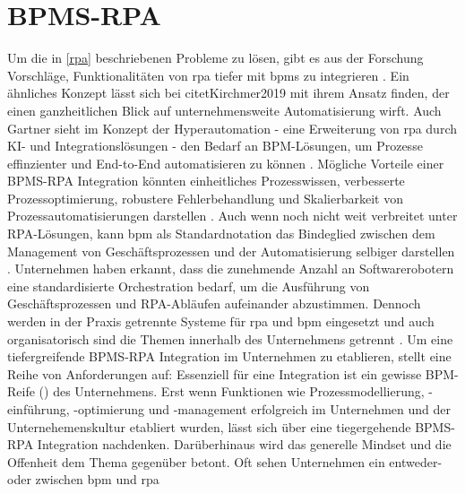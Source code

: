     \section{BPMS-RPA}
    Um die in \ref{rpa} beschriebenen Probleme zu lösen, gibt es aus der Forschung Vorschläge, Funktionalitäten von \gls{rpa} tiefer mit \gls{bpms} zu integrieren \citep{Flechsig2019}. Ein ähnliches Konzept lässt sich bei citet{Kirchmer2019} mit ihrem  Ansatz finden, der einen ganzheitlichen Blick auf unternehmensweite Automatisierung wirft. Auch Gartner sieht im Konzept der Hyperautomation - eine Erweiterung von \gls{rpa} durch KI- und Integrationslösungen - den Bedarf an BPM-Lösungen, um Prozesse effinzienter und End-to-End automatisieren zu können \citep{Gartner2024}. Mögliche Vorteile einer BPMS-RPA Integration könnten einheitliches Prozesswissen, verbesserte Prozessoptimierung, robustere Fehlerbehandlung und Skalierbarkeit von Prozessautomatisierungen darstellen \citep[S. 2]{Flechsig2022Umfrage}. Auch wenn noch nicht weit verbreitet unter RPA-Lösungen, kann \gls{bpm} als Standardnotation das Bindeglied zwischen dem Management von Geschäftsprozessen und der Automatisierung selbiger darstellen \citep{Völker2021}. Unternehmen haben erkannt, dass die zunehmende Anzahl an Softwarerobotern eine standardisierte Orchestration bedarf, um die Ausführung von Geschäftsprozessen und RPA-Abläufen aufeinander abzustimmen. Dennoch werden in der Praxis  getrennte Systeme für \gls{rpa} und \gls{bpm} eingesetzt und auch organisatorisch sind die Themen innerhalb des Unternehmens getrennt \citep[S. 6ff]{Flechsig2022Umfrage}. Um eine tiefergreifende BPMS-RPA Integration im Unternehmen zu etablieren, stellt \citet{Flechsig2022Umfrage} eine Reihe von Anforderungen auf: Essenziell für eine Integration ist ein gewisse BPM-Reife () des Unternehmens. Erst wenn Funktionen wie Prozessmodellierung, -einführung, -optimierung und -management erfolgreich im Unternehmen und der Unternehemenskultur etabliert wurden, lässt sich über eine tiegergehende BPMS-RPA Integration nachdenken. Darüberhinaus wird das generelle Mindset und die Offenheit dem Thema gegenüber betont. Oft sehen Unternehmen ein entweder-oder zwischen \gls{bpm} und \gls{rpa}


